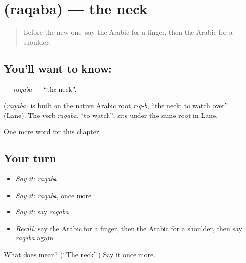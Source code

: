 \section[\texorpdfstring{\ar{رقبة} (raqaba)}{رقبة (raqaba)}]{ (raqaba) — the neck}

\label{lesson:AR-C51-raqaba}



\begin{quote}
Before the new one: say the Arabic for a finger, then the Arabic for a shoulder.
\end{quote}

\subsection*{You'll want to know: }
\textbf{} — \emph{raqaba} — \textquotedblleft{}the neck\textquotedblright{}.

\begin{cousinweb}
\textbf{} (\emph{raqaba}) is built on the native Arabic root \emph{r-q-b}, \textquotedblleft{}the neck; to watch over\textquotedblright{} (Lane). The verb \emph{raqaba}, \textquotedblleft{}to watch\textquotedblright{}, sits under the same root in Lane.
\end{cousinweb}

\begin{grammarlens}[title={What you've built}]
One more word for this chapter.
\end{grammarlens}

\subsection*{Your turn}
\begin{itemize}
\raggedright
  \item \emph{Say it:} \emph{raqaba}
  \item \emph{Say it:} \emph{raqaba}, once more
  \item \emph{Say it:} say \emph{raqaba}
  \item \emph{Recall:} say the Arabic for a finger, then the Arabic for a shoulder, then say \emph{raqaba} again
\end{itemize}

\begin{tcolorbox}[breakable,colback=teal!4,colframe=teal!35!black,title={Before you move on}]
What does  mean? (\textquotedblleft{}The neck\textquotedblright{}.) Say it once more.
\end{tcolorbox}
